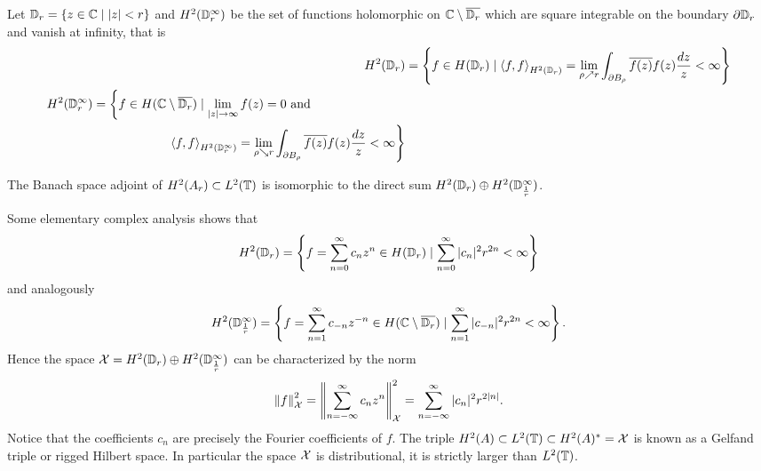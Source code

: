 Let $\mathbb{D}_r = \left\{ z \in \mathbb{C} \mid |z| < r \right\}$ and 
$H^2 (\mathbb{D}_r^\infty)$ be the set of functions holomorphic on 
$\mathbb{C} \setminus \overline{\mathbb{D}_r}$ which are square integrable on the boundary 
$\partial \mathbb{D}_r$ and vanish at infinity, that is
\begin{align}
    H^2 (\mathbb{D}_r) &= \left\{ f \in H(\mathbb{D}_r) \mid 
    \left\langle f, f \right\rangle_{H^2(\mathbb{D}_r)} = 
    \lim_{\rho \nearrow r} \int_{\partial B_\rho} \overline{f (z)} f(z) \frac{dz}{z} < \infty \right\} \\
    \begin{split}
        H^2 (\mathbb{D}_r^\infty) &= \left\{ f \in H(\mathbb{C} \setminus \overline{\mathbb{D}_r}) \mid 
        \lim_{|z| \to \infty} f(z) = 0 \text{ and } \right.\\
        &\quad\quad\quad\quad\quad\quad
        \left.\left\langle f, f \right\rangle_{H^2(\mathbb{D}_r^\infty)} = 
        \lim_{\rho \searrow r} 
        \int_{\partial B_\rho} \overline{f (z)} f(z) \frac{dz}{z} < \infty \right\} 
    \end{split}
\end{align}

\begin{theorem}
    The Banach space adjoint of $H^2(A_r) \subset L^2(\mathbb{T})$ is isomorphic to the direct 
    sum $H^2 (\mathbb{D}_r) \oplus H^2 (\mathbb{D}_{\frac{1}{r}}^\infty)$. 
\end{theorem}

Some elementary complex analysis shows that 
\begin{equation}
    H^2 (\mathbb{D}_r) = \left\{ f = \sum_{n=0}^{\infty} c_n z^n \in H(\mathbb{D}_r) \mid 
    \sum_{n=0}^{\infty} |c_n|^2 r^{2n} < \infty\right\}
\end{equation}
and analogously
\begin{equation}
    H^2 (\mathbb{D}_{\frac{1}{r}}^\infty) = \left\{ f = \sum_{n=1}^{\infty} c_{-n} z^{-n} \in H(\mathbb{C} \setminus \overline{\mathbb{D}_r}) \mid 
    \sum_{n=1}^{\infty} |c_{-n}|^2 r^{2n} < \infty\right\} . 
\end{equation}
Hence the space $\mathcal{X} = H^2 (\mathbb{D}_r) \oplus H^2 (\mathbb{D}_{\frac{1}{r}}^\infty)$ can be 
characterized by the norm
\begin{equation}
    \left\| f \right\|_{\mathcal{X}}^2 = \left\| \sum_{n=-\infty}^{\infty} c_n z^n \right\|_{\mathcal{X}}^2 
    = \sum_{n=-\infty}^{\infty} |c_n|^2 r^{2 |n|} . 
\end{equation}
Notice that the coefficients $c_n$ are precisely the Fourier coefficients of $f$. The 
triple $H^2 (A) \subset L^2 (\mathbb{T}) \subset H^2 (A)^* = \mathcal{X}$ is known as a Gelfand triple 
or rigged Hilbert space. In particular the space $\mathcal{X}$ is distributional, it is 
strictly larger than $L^2 (\mathbb{T})$. 

